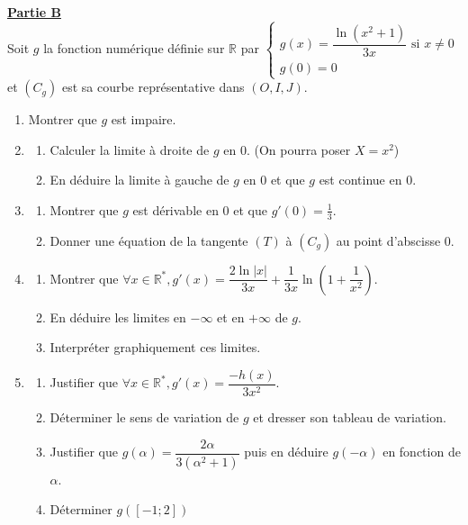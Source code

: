 \documentclass[12pt,a4paper]{article}
\begin{document}
\noindent \underline{\textbf{Partie B}} \\
Soit $g$ la fonction numérique définie sur $\mathbb{R}$ par 
$\begin{cases} g(x) = \dfrac{\ln(x^2+1)}{3x} \text{ si } x \neq 0 \\ g(0) = 0 \end{cases}$ et $(C_g)$ est sa courbe représentative dans $(O, I, J)$.
\begin{enumerate}
    \item Montrer que $g$ est impaire.
    \item \begin{enumerate}
        \item Calculer la limite à droite de $g$ en 0. (On pourra poser $X=x^2$)
        \item En déduire la limite à gauche de $g$ en 0 et que $g$ est continue en 0.
    \end{enumerate}
    \item \begin{enumerate}
        \item Montrer que $g$ est dérivable en 0 et que $g'(0) = \frac{1}{3}$.
        \item Donner une équation de la tangente $(T)$ à $(C_g)$ au point d'abscisse 0.
    \end{enumerate}
    \item \begin{enumerate}
        \item Montrer que $\forall x \in \mathbb{R}^*, g'(x) = \dfrac{2\ln|x|}{3x} + \dfrac{1}{3x}\ln\left( 1 + \dfrac{1}{x^2}\right) $.
        \item En déduire les limites en $-\infty$ et en $+\infty$ de $g$.
        \item Interpréter graphiquement ces limites.
    \end{enumerate}
    \item \begin{enumerate}
        \item Justifier que $\forall x \in \mathbb{R}^*, g'(x) = \dfrac{-h(x)}{3x^2}$.
        \item Déterminer le sens de variation de $g$ et dresser son tableau de variation.
        \item Justifier que $g(\alpha) = \dfrac{2\alpha}{3(\alpha^2+1)}$ puis en déduire $g(-\alpha)$ en fonction de $\alpha$.
        \item Déterminer $g([-1; 2])$
    \end{enumerate}

\end{enumerate}
\end{document}
